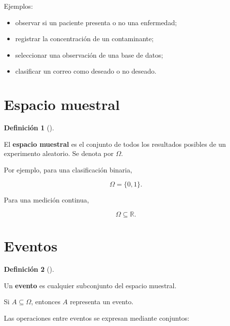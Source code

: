 \documentclass[
  spanish,
  10.5pt,
  letterpaper,
  DIV=11,
  numbers=noendperiod,
  oneside,
  open=any]{scrreprt}
\providecommand{\tightlist}{%
  \setlength{\itemsep}{0pt}\setlength{\parskip}{0pt}}
\theoremstyle{definition}
\newtheorem{definition}{Definición}[chapter]
\theoremstyle{definition}
\theoremstyle{plain}
\theoremstyle{remark}
\begin{document}
Ejemplos:

\begin{itemize}
\tightlist
\item
  observar si un paciente presenta o no una enfermedad;
\item
  registrar la concentración de un contaminante;
\item
  seleccionar una observación de una base de datos;
\item
  clasificar un correo como deseado o no deseado.
\end{itemize}

\section*{Espacio muestral}\label{espacio-muestral}


\begin{definition}[]\protect\hypertarget{def-espacio-muestral}{}\label{def-espacio-muestral}

El \textbf{espacio muestral} es el conjunto de todos los resultados
posibles de un experimento aleatorio. Se denota por \(\Omega\).

\end{definition}

Por ejemplo, para una clasificación binaria,

\[
\Omega=\{0,1\}.
\]

Para una medición continua,

\[
\Omega\subseteq\mathbb{R}.
\]

\section*{Eventos}\label{eventos}


\begin{definition}[]\protect\hypertarget{def-evento}{}\label{def-evento}

Un \textbf{evento} es cualquier subconjunto del espacio muestral.

\end{definition}

Si \(A\subseteq\Omega\), entonces \(A\) representa un evento.

Las operaciones entre eventos se expresan mediante conjuntos:
\end{document}
